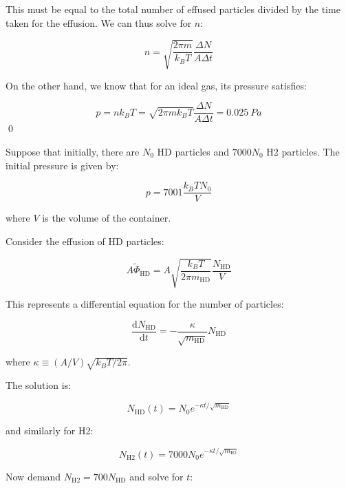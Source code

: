 \documentclass[12pt]{article}
\begin{document}
This must be equal to the total number of effused particles divided by the time taken for the effusion. We can thus solve for $n$:

\begin{equation}
    n = \sqrt{\frac{2\pi m}{k_{B}T}} \frac{\Delta N}{A \Delta t}
\end{equation}

On the other hand, we know that for an ideal gas, its pressure satisfies:

\begin{equation}
    p = nk_{B}T = \sqrt{2\pi m k_{B} T} \frac{\Delta N}{A \Delta t} = \qty{0.025}{Pa}
\end{equation}
\qed



Suppose that initially, there are $N_{0}$ HD particles and $7000N_{0}$ H2 particles. The initial pressure is given by:

\begin{equation}
    p = 7001 \frac{k_{B}TN_{0}}{V}
\end{equation}

where $V$ is the volume of the container.

Consider the effusion of HD particles:

\begin{equation}
    A\tilde{\Phi}_{\text{HD}} = A\sqrt{\frac{k_{B}T}{2\pi m_{\text{HD}}}} \frac{N_{\text{HD}}}{V}
\end{equation}

This represents a differential equation for the number of particles:

\begin{equation}
    \frac{\mathrm{d}N_{\text{HD}}}{\mathrm{d}t} = -\frac{\kappa}{\sqrt{m_{\text{HD}}}} N_{\text{HD}}
\end{equation}

where $\kappa \equiv (A/V) \sqrt{k_{B}T/2\pi}$.

The solution is:

\begin{equation}
    N_{\text{HD}}(t) = N_{0} e^{-\kappa t/\sqrt{m_{\text{HD}}}}
\end{equation}

and similarly for H2:

\begin{equation}
    N_{\text{H2}}(t) = 7000N_{0} e^{-\kappa t/\sqrt{m_{\text{H2}}}}
\end{equation}

Now demand $N_{\text{H2}} = 700N_{\text{HD}}$ and solve for $t$:
\end{document}
